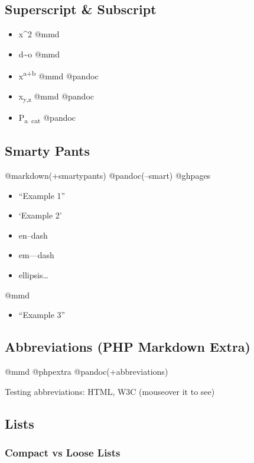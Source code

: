 \documentclass[]{article}
\providecommand{\tightlist}{%
  \setlength{\itemsep}{0pt}\setlength{\parskip}{0pt}}
\begin{document}
\subsection{Superscript \& Subscript}\label{superscript-subscript}

\begin{itemize}
\tightlist
\item
  x\^{}2 @mmd
\item
  d\textasciitilde{}o @mmd
\item
  x\textsuperscript{a+b} @mmd @pandoc
\item
  x\textsubscript{y,z} @mmd @pandoc
\item
  P\textsubscript{a~cat} @pandoc
\end{itemize}

\subsection{Smarty Pants}\label{smarty-pants}

@markdown(+smartypants) @pandoc(--smart) @ghpages

\begin{itemize}
\tightlist
\item
  ``Example 1''
\item
  `Example 2'
\item
  en--dash
\item
  em---dash
\item
  ellipsis\ldots{}
\end{itemize}

@mmd

\begin{itemize}
\tightlist
\item
  ``Example 3''
\end{itemize}

\subsection{Abbreviations (PHP Markdown
Extra)}\label{abbreviations-php-markdown-extra}

@mmd @phpextra @pandoc(+abbreviations)

Testing abbreviations: HTML, W3C (mouseover it to see)

\subsection{Lists}\label{lists}

\subsubsection{Compact vs Loose Lists}\label{compact-vs-loose-lists}
\end{document}
